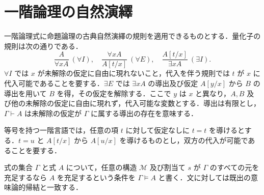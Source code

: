 \section{一階論理の自然演繹}
\begin{defn}[一階論理の導出]
一階論理式に命題論理の古典自然演繹の規則を適用できるものとする．量化子の規則は次の通りである．
\[
\frac{A}{\forall x A}\ (\forall I),\quad
\frac{\forall x A}{A[t/x]}\ (\forall E),\quad
\frac{A[t/x]}{\exists x A}\ (\exists I).
\]
$\forall I$ では $x$ が未解除の仮定に自由に現れないこと，代入を伴う規則では $t$ が $x$ に代入可能であることを要する．$\exists E$ では $\exists x A$ の導出及び仮定 $A[y/x]$ から $B$ の導出を用いて $B$ を得，その仮定を解除する．ここで $y$ は $x$ と異なり，$A,B$ 及び他の未解除の仮定に自由に現れず，代入可能な変数とする．導出は有限とし，$\Gamma\vdash A$ は未解除の仮定が $\Gamma$ に属する導出の存在を意味する．
\end{defn}
\begin{defn}[等号の推論規則]
等号を持つ一階言語では，任意の項 $t$ に対して仮定なしに $t=t$ を導けるとする．$t=u$ と $A[t/x]$ から $A[u/x]$ を導けるものとし，双方の代入が可能であることを要する．
\end{defn}
\begin{defn}[自由変数を含む式の意味論的帰結]
式の集合 $\Gamma$ と式 $A$ について，任意の構造 $\mathcal M$ 及び割当て $s$ が $\Gamma$ のすべての元を充足するなら $A$ を充足するという条件を $\Gamma\models A$ と書く．文に対しては既出の意味論的帰結と一致する．
\end{defn}

